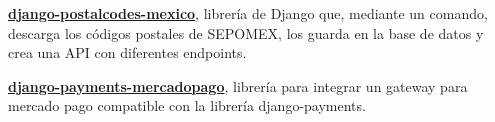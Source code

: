 

\begin{cvpubs}

  \cvpub
    {
      \begin{cvlist}
        \item {\textbf{\href{https://pypi.org/project/django-postalcodes-mexico/}{django-postalcodes-mexico}}, librería de Django que, mediante un comando, descarga los códigos postales de SEPOMEX, los guarda en la base de datos y crea una API con diferentes endpoints.}
  \item {\textbf{\href{https://pypi.org/project/django-payments-mercadopago/}{django-payments-mercadopago}}, librería para integrar un gateway para mercado pago compatible con la librería django-payments. }
      \end{cvlist}
    }
\vspace{-15pt}
\end{cvpubs}
